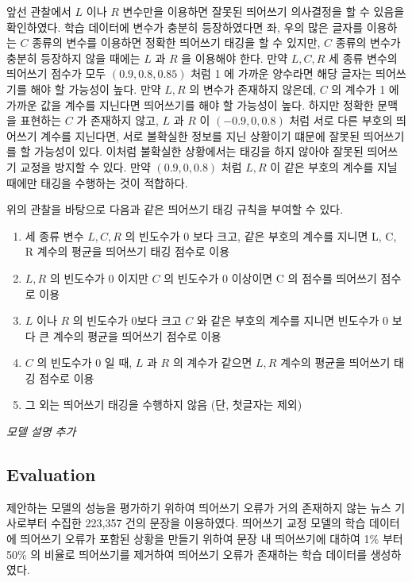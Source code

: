 \documentclass[11pt]{article}
\begin{document}
앞선 관찰에서 $L$ 이나 $R$ 변수만을 이용하면 잘못된 띄어쓰기 의사결정을 할 수 있음을 확인하였다.
학습 데이터에 변수가 충분히 등장하였다면 좌, 우의 많은 글자를 이용하는 $C$ 종류의 변수를 이용하면 정확한 띄어쓰기 태깅을 할 수 있지만, $C$ 종류의 변수가 충분히 등장하지 않을 때에는 $L$ 과 $R$ 을 이용해야 한다.
만약 $L, C, R$ 세 종류 변수의 띄어쓰기 점수가 모두 $(0.9, 0.8, 0.85)$ 처럼 1 에 가까운 양수라면 해당 글자는 띄어쓰기를 해야 할 가능성이 높다.
만약 $L, R$ 의 변수가 존재하지 않은데, $C$ 의 계수가 1 에 가까운 값을 계수를 지닌다면 띄어쓰기를 해야 할 가능성이 높다.
하지만 정확한 문맥을 표현하는 $C$ 가 존재하지 않고, $L$ 과 $R$ 이 $(-0.9, 0, 0.8)$ 처럼 서로 다른 부호의 띄어쓰기 계수를 지닌다면, 서로 불확실한 정보를 지닌 상황이기 떄문에 잘못된 띄어쓰기를 할 가능성이 있다.
이처럼 불확실한 상황에서는 태깅을 하지 않아야 잘못된 띄어쓰기 교정을 방지할 수 있다.
만약 $(0.9, 0, 0.8)$ 처럼 $L, R$ 이 같은 부호의 계수를 지닐 때에만 태깅을 수행하는 것이 적합하다.

위의 관찰을 바탕으로 다음과 같은 띄어쓰기 태깅 규칙을 부여할 수 있다.

\begin{enumerate}[noitemsep]
  \item 세 종류 변수  $L, C, R$ 의 빈도수가 0 보다 크고, 같은 부호의 계수를 지니면 L, C, R 계수의 평균을 띄어쓰기 태깅 점수로 이용
  \item $L, R$ 의 빈도수가 0 이지만 $C$ 의 빈도수가 0 이상이면 C 의 점수를 띄어쓰기 점수로 이용
  \item $L$ 이나  $R$ 의 빈도수가 0보다 크고 $C$ 와 같은 부호의 계수를 지니면 빈도수가 0 보다 큰 계수의 평균을 띄어쓰기 점수로 이용
  \item $C$ 의 빈도수가 0 일 때, $L$ 과 $R$ 의 계수가 같으면 $L, R$ 계수의 평균을 띄어쓰기 태깅 점수로 이용
  \item 그 외는 띄어쓰기 태깅을 수행하지 않음 (단, 첫글자는 제외)
\end{enumerate}





\vspace{3cm}
\textit{모델 설명 추가}
\vspace{3cm}



\subsection{Evaluation}

제안하는 모델의 성능을 평가하기 위하여 띄어쓰기 오류가 거의 존재하지 않는 뉴스 기사로부터 수집한 223,357 건의 문장을 이용하였다.
띄어쓰기 교정 모델의 학습 데이터에 띄어쓰기 오류가 포함된 상황을 만들기 위하여 문장 내 띄어쓰기에 대하여 1\% 부터 50\% 의 비율로 띄어쓰기를 제거하여 띄어쓰기 오류가 존재하는 학습 데이터를 생성하였다.
\end{document}

